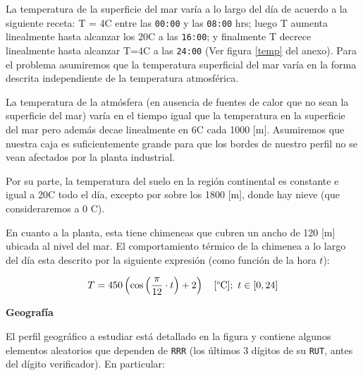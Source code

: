 \documentclass[letterpaper, 11pt]{article}
\newcommand{\newtitle}[1]{\noindent\Large{\textbf{#1}}\\\vspace*{-0.5em}\normalsize}
\begin{document}
La temperatura de la superficie del mar varía a lo largo del día de acuerdo a
la siguiente receta: T = 4\textordmasculine C entre las \texttt{00:00} y las
\texttt{08:00} hrs; luego T aumenta linealmente hasta alcanzar los
20\textordmasculine C a las \texttt{16:00}; y finalmente T decrece linealmente
hasta alcanzar T=4\textordmasculine C a las \texttt{24:00} (Ver figura \ref{temp} del anexo). Para el problema asumiremos que la temperatura superficial del mar varía en la forma descrita independiente de la temperatura atmosférica.

La temperatura de la atmósfera (en ausencia de fuentes de calor que no sean la
superficie del mar) varía en el tiempo igual que la temperatura en la
superficie del mar pero además decae linealmente en 6\textordmasculine C cada
1000 [m]. Asumiremos que nuestra caja es suficientemente grande para que los
bordes de nuestro perfil no se vean afectados por la planta industrial.

Por su parte, la temperatura del suelo en la región continental es constante e
igual a 20\textordmasculine C todo el día, excepto por sobre los 1800 [m],
donde hay nieve (que consideraremos a 0 \textordmasculine C).

En cuanto a la planta, esta tiene chimeneas que cubren un ancho de 120 [m]
ubicada al nivel del mar. El comportamiento térmico de la chimenea a lo largo
del día esta descrito por la siguiente expresión (como función de la hora $t$):

$$
T = 450 \left(  \cos\left( \frac{\pi}{12}\cdot t \right) + 2 \right)
\quad [{\rm \degree C}];\ t \in [0,24]
$$

\newtitle{Geografía}

El perfil geográfico a estudiar está detallado en la figura y contiene algunos
elementos aleatorios que dependen de \texttt{RRR} (los últimos 3 dígitos de su
\texttt{RUT}, antes del dígito verificador). En particular:
\end{document}
